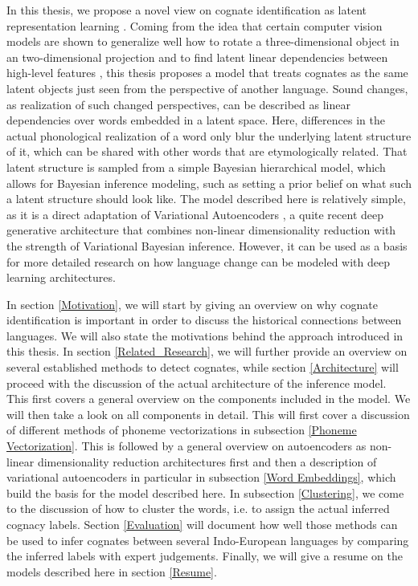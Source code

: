 \documentclass[6pt]{article}
\begin{document}
In this thesis, we propose a novel view on cognate identification as latent representation learning \citep{bengio2013representation,Goodfellow-et-al-2016-Book}. Coming from the idea that certain computer vision models are shown to generalize well how to rotate a three-dimensional object in an two-dimensional projection and to find latent linear dependencies between high-level features \citep{radford2015unsupervised,dosovitskiy2015learning}, this thesis proposes a model that treats cognates as the same latent objects just seen from the perspective of another language. Sound changes, as realization of such changed perspectives, can be described as linear dependencies over words embedded in a latent space. Here, differences in the actual phonological realization of a word only blur the underlying latent structure of it, which can be shared with other words that are etymologically related. That latent structure is sampled from a simple Bayesian hierarchical model, which allows for Bayesian inference modeling, such as setting a prior belief on what such a latent structure should look like. The model described here is relatively simple, as it is a direct adaptation of Variational Autoencoders \citep{kingma2013auto}, a quite recent deep generative architecture that combines non-linear dimensionality reduction with the strength of Variational Bayesian inference. However, it can be used as a basis for more detailed research on how language change can be modeled with deep learning architectures. 


In section \ref{Motivation}, we will start by giving an overview on why cognate identification is important in order to discuss the historical connections between languages. We will also state the motivations behind the approach introduced in this thesis. In section \ref{Related_Research}, we will further provide an overview on several established methods to detect cognates, while section \ref{Architecture} will proceed with the discussion of the actual architecture of the inference model. This first covers a general overview on the components included in the model. We will then take a look on all components in detail. This will first cover a discussion of different methods of phoneme vectorizations in subsection \ref{Phoneme Vectorization}. This is followed by a general overview on autoencoders as non-linear dimensionality reduction architectures first and then a description of variational autoencoders in particular in subsection \ref{Word Embeddings}, which build the basis for the model described here.  In subsection \ref{Clustering}, we come to the discussion of how to cluster the words, i.e. to assign the actual inferred cognacy labels. Section \ref{Evaluation} will document how well those methods can be used to infer cognates between several Indo-European languages by comparing the inferred labels with expert judgements. Finally, we will give a resume on the models described here in section \ref{Resume}.
\end{document}
